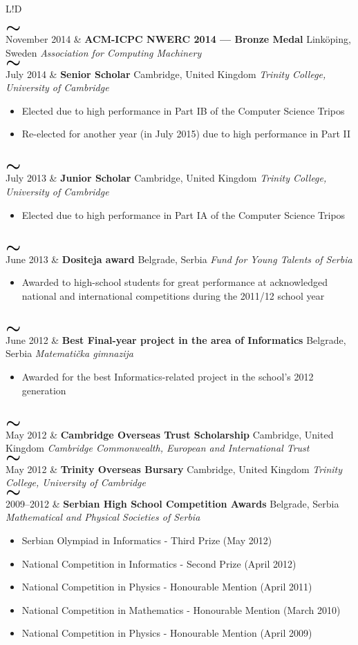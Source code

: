 \documentclass[11pt]{article}
\def\mysim{{\textcolor{maincolour}{$\LARGE\boldsymbol\sim$}}}
\newcommand{\VRule}{\color{lightgray}\vrule width 0.5pt}
\newcommand{\mytilde}[1]{\mysim \\ #1}
\newcommand{\cvtable}[1]{%
\begin{tabular}{L!{\VRule}D}#1\end{tabular}}
\newcommand{\mainitem}[4]{\textbf{#1} \hfill #3 \newline \emph{#2} \hfill #4}
\newcommand{\sitemize}[1]{%
	\vspace{0.5em}
	\begin{itemize}
		#1	
	\end{itemize}
}
\newcommand{\sitem}{\item[$\sim$]}
\begin{document}
\cvtable{%

\mytilde{November 2014} & \mainitem{ACM-ICPC NWERC 2014 --- Bronze Medal}{Association for Computing Machinery}{Link\"{o}ping, Sweden}{}
\\[5pt]

\mytilde{July 2014} & \mainitem{Senior Scholar}{Trinity College, University of Cambridge}{Cambridge, United Kingdom}{}
	
\sitemize{%
	\sitem Elected due to high performance in Part IB of the Computer Science Tripos
	\sitem Re-elected for another year (in July 2015) due to high performance in Part II
}\vspace{-\baselineskip}\mbox{}
\\[5pt]

\mytilde{July 2013} & \mainitem{Junior Scholar}{Trinity College, University of Cambridge}{Cambridge, United Kingdom}{}

\sitemize{%
	\sitem Elected due to high performance in Part IA of the Computer Science Tripos
}\vspace{-\baselineskip}\mbox{}
\\[5pt]

\mytilde{June 2013} & \mainitem{Dositeja award}{Fund for Young Talents of Serbia}{Belgrade, Serbia}{}
	
\sitemize{%
	\sitem Awarded to high-school students for great performance at acknowledged national and international competitions during the 2011/12 school year
}\vspace{-\baselineskip}\mbox{}
\\[5pt]

\mytilde{June 2012} & \mainitem{Best Final-year project in the area of Informatics}{Matemati\v{c}ka gimnazija}{Belgrade, Serbia}{}
\sitemize{%
	\sitem Awarded for the best Informatics-related project in the school's 2012 generation
}\vspace{-\baselineskip}\mbox{}
\\[5pt]

\mytilde{May 2012} & \mainitem{Cambridge Overseas Trust Scholarship}{Cambridge Commonwealth, European and International Trust}{Cambridge, United Kingdom}{}
\\[5pt]

\mytilde{May 2012} & \mainitem{Trinity Overseas Bursary}{Trinity College, University of Cambridge}{Cambridge, United Kingdom}{}
\\[5pt]

\mytilde{2009--2012} & \mainitem{Serbian High School Competition Awards}{Mathematical and Physical Societies of Serbia}{Belgrade, Serbia}{}

\sitemize{%
	\sitem Serbian Olympiad in Informatics - Third Prize (May 2012)
	\sitem National Competition in Informatics - Second Prize (April 2012)
	\sitem National Competition in Physics - Honourable Mention (April 2011)
	\sitem National Competition in Mathematics - Honourable Mention (March 2010)
	\sitem National Competition in Physics - Honourable Mention (April 2009)
}\vspace{-\baselineskip}\mbox{}
}
\end{document}
